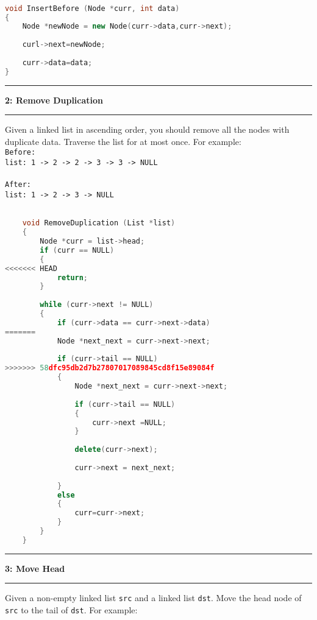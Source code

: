 \documentclass[10.5pt]{article}
\newcommand\question[2]{\vspace{.25in}\hrule\textbf{#1: #2}\vspace{.5em}\hrule\vspace{.10in}}
\begin{document}
\hrulefill
\begin{lstlisting}[language=C++]

void InsertBefore (Node *curr, int data)
{
    Node *newNode = new Node(curr->data,curr->next);
    
    curl->next=newNode;
    
    curr->data=data;
}

\end{lstlisting}

\pagebreak

\question{2}{Remove Duplication}
Given a linked list in ascending order, you should remove all the nodes with duplicate data. Traverse the list for at most once. For example: \\

\texttt{Before:}\\
\texttt{list: 1 -> 2 -> 2 -> 3 -> 3 -> NULL}\\
\\
\texttt{After:}\\
\texttt{list: 1 -> 2 -> 3 -> NULL}\\


\hrulefill
\begin{lstlisting}[language=C++]

    void RemoveDuplication (List *list)
    {
        Node *curr = list->head;
        if (curr == NULL) 
        {
<<<<<<< HEAD
            return;
        }
        
        while (curr->next != NULL)
        {
            if (curr->data == curr->next->data)
=======
            Node *next_next = curr->next->next;
                        
            if (curr->tail == NULL)
>>>>>>> 58dfc95db2d7b27807017089845cd8f15e89084f
            {
                Node *next_next = curr->next->next;
                            
                if (curr->tail == NULL)
                {
                    curr->next =NULL;
                }
                
                delete(curr->next);
                
                curr->next = next_next;
    
            }
            else
            {
                curr=curr->next;
            }
        }
    }
    \end{lstlisting}
    \pagebreak
    
    
    \question{3}{Move Head}
    Given a non-empty linked list \texttt{src} and a linked list \texttt{dst}. Move the head node of \texttt{src} to the tail of \texttt{dst}. For example: \\
    
\end{document}
